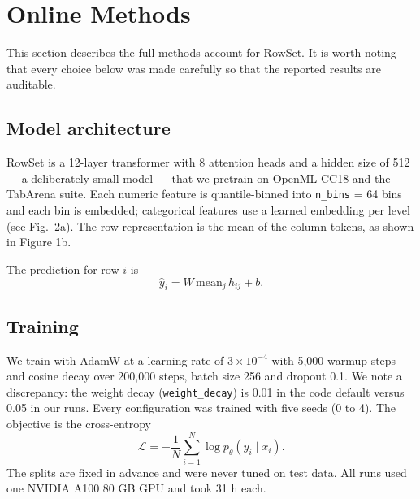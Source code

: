 \documentclass[11pt]{article}
\begin{document}
\section{Online Methods}

This section describes the full methods account for RowSet. It is worth noting that every choice below was made carefully so that the reported results are auditable.

\subsection{Model architecture}

RowSet is a 12-layer transformer with 8 attention heads and a hidden size of 512 --- a deliberately small model --- that we pretrain on OpenML-CC18 and the TabArena suite. Each numeric feature is quantile-binned into \texttt{n\_bins} = 64 bins and each bin is embedded; categorical features use a learned embedding per level (see Fig.~2a). The row representation is the mean of the column tokens, as shown in Figure 1b.

The prediction for row $i$ is
\begin{equation}
\hat{y}_i = W \, \mathrm{mean}_j \, h_{ij} + b .
\label{eq:head}
\end{equation}

\subsection{Training}

We train with AdamW at a learning rate of $3\times10^{-4}$ with 5,000 warmup steps and cosine decay over 200,000 steps, batch size 256 and dropout 0.1. We note a discrepancy: the weight decay (\texttt{weight\_decay}) is 0.01 in the code default versus 0.05 in our runs. Every configuration was trained with five seeds (0 to 4). The objective is the cross-entropy
\begin{equation}
\mathcal{L} = -\frac{1}{N}\sum_{i=1}^{N} \log p_\theta(y_i \mid x_i).
\label{eq:loss}
\end{equation}
The splits are fixed in advance and were never tuned on test data. All runs used one NVIDIA A100 80 GB GPU and took 31 h each.
\end{document}
